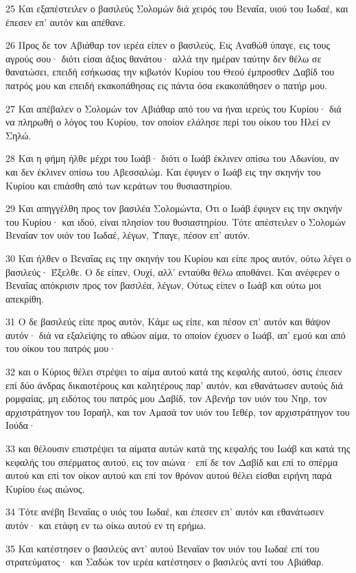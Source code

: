 \par 25 Και εξαπέστειλεν ο βασιλεύς Σολομών διά χειρός του Βεναΐα, υιού του Ιωδαέ, και έπεσεν επ' αυτόν και απέθανε.
\par 26 Προς δε τον Αβιάθαρ τον ιερέα είπεν ο βασιλεύς, Εις Αναθώθ ύπαγε, εις τους αγρούς σου· διότι είσαι άξιος θανάτου· αλλά την ημέραν ταύτην δεν θέλω σε θανατώσει, επειδή εσήκωσας την κιβωτόν Κυρίου του Θεού έμπροσθεν Δαβίδ του πατρός μου και επειδή εκακοπάθησας εις πάντα όσα εκακοπάθησεν ο πατήρ μου.
\par 27 Και απέβαλεν ο Σολομών τον Αβιάθαρ από του να ήναι ιερεύς του Κυρίου· διά να πληρωθή ο λόγος του Κυρίου, τον οποίον ελάλησε περί του οίκου του Ηλεί εν Σηλώ.
\par 28 Και η φήμη ήλθε μέχρι του Ιωάβ· διότι ο Ιωάβ έκλινεν οπίσω του Αδωνίου, αν και δεν έκλινεν οπίσω του Αβεσσαλώμ. Και έφυγεν ο Ιωάβ εις την σκηνήν του Κυρίου και επιάσθη από των κεράτων του θυσιαστηρίου.
\par 29 Και απηγγέλθη προς τον βασιλέα Σολομώντα, Ότι ο Ιωάβ έφυγεν εις την σκηνήν του Κυρίου· και ιδού, είναι πλησίον του θυσιαστηρίου. Τότε απέστειλεν ο Σολομών Βεναΐαν τον υιόν του Ιωδαέ, λέγων, Ύπαγε, πέσον επ' αυτόν.
\par 30 Και ήλθεν ο Βεναΐας εις την σκηνήν του Κυρίου και είπε προς αυτόν, ούτω λέγει ο βασιλεύς· Έξελθε. Ο δε είπεν, Ουχί, αλλ' ενταύθα θέλω αποθάνει. Και ανέφερεν ο Βεναΐας απόκρισιν προς τον βασιλέα, λέγων, Ούτως είπεν ο Ιωάβ και ούτω μοι απεκρίθη.
\par 31 Ο δε βασιλεύς είπε προς αυτόν, Κάμε ως είπε, και πέσον επ' αυτόν και θάψον αυτόν· διά να εξαλείψης το αθώον αίμα, το οποίον έχυσεν ο Ιωάβ, απ' εμού και από του οίκου του πατρός μου·
\par 32 και ο Κύριος θέλει στρέψει το αίμα αυτού κατά της κεφαλής αυτού, όστις έπεσεν επί δύο άνδρας δικαιοτέρους και καλητέρους παρ' αυτόν, και εθανάτωσεν αυτούς διά ρομφαίας, μη ειδότος του πατρός μου Δαβίδ, τον Αβενήρ τον υιόν του Νηρ, τον αρχιστράτηγον του Ισραήλ, και τον Αμασά τον υιόν του Ιεθέρ, τον αρχιστράτηγον του Ιούδα·
\par 33 και θέλουσιν επιστρέψει τα αίματα αυτών κατά της κεφαλής του Ιωάβ και κατά της κεφαλής του σπέρματος αυτού, εις τον αιώνα· επί δε τον Δαβίδ και επί το σπέρμα αυτού και επί τον οίκον αυτού και επί τον θρόνον αυτού θέλει είσθαι ειρήνη παρά Κυρίου έως αιώνος.
\par 34 Τότε ανέβη Βεναΐας ο υιός του Ιωδαέ, και έπεσεν επ' αυτόν και εθανάτωσεν αυτόν· και ετάφη εν τω οίκω αυτού εν τη ερήμω.
\par 35 Και κατέστησεν ο βασιλεύς αντ' αυτού Βεναΐαν τον υιόν του Ιωδαέ επί του στρατεύματος· και Σαδώκ τον ιερέα κατέστησεν ο βασιλεύς αντί του Αβιάθαρ.
